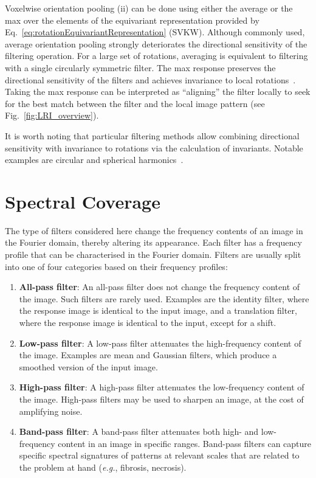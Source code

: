 \documentclass[fleqn,a4paper,oneside,openany]{book}
\newcommand\textid[1]{{\normalsize{\idfont #1}}}
\begin{document}
Voxelwise orientation pooling (ii) can be done using either the average or the max over the elements of the equivariant representation provided by Eq.~\eqref{eq:rotationEquivariantRepresentation} (\textid{SVKW}).
Although commonly used, average orientation pooling strongly deteriorates the directional sensitivity of the filtering operation. For a large set of rotations, averaging is equivalent to filtering with a single circularly symmetric filter. 
The max response preserves the directional sensitivity of the filters and achieves invariance to local rotations~\cite{CoW2016b,AFO2019}.
Taking the max response can be  interpreted as ``aligning'' the filter locally to seek for the best match between the filter and the local image pattern (see Fig.~\ref{fig:LRI_overview}).

It is worth noting that particular filtering methods allow combining directional sensitivity with invariance to rotations via the calculation of invariants. Notable examples are circular and spherical harmonics~\cite{KaM2010,eickenberg2017solid,Depeursinge2018}.
%
\section{Spectral Coverage}\label{sec:spectalCoverage}
%
The type of filters considered here change the frequency contents of an image in the Fourier domain, thereby altering its appearance.
Each filter has a frequency profile that can be characterised in the Fourier domain. Filters are usually split into one of four categories based on their frequency profiles:
%
\begin{enumerate}
\item \textbf{All-pass filter}: An all-pass filter does not change the frequency content of the image. Such filters are rarely used. Examples are the identity filter, where the response image is identical to the input image, and a translation filter, where the response image is identical to the input, except for a shift.
\item \textbf{Low-pass filter}: A low-pass filter attenuates the high-frequency content of the image. Examples are mean and Gaussian filters, which produce a smoothed version of the input image.
\item \textbf{High-pass filter}: A high-pass filter attenuates the low-frequency content of the image. High-pass filters may be used to sharpen an image, at the cost of amplifying noise. 
\item \textbf{Band-pass filter}: A band-pass filter attenuates both high- and low-frequency content in an image in specific ranges.
Band-pass filters can capture specific spectral signatures of patterns at relevant scales that are related to the problem at hand (\textit{e.g.}, fibrosis, necrosis).
\end{enumerate}
\end{document}
